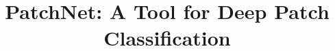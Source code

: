 \documentclass[conference]{IEEEtran}
\begin{document}
\title{PatchNet: A Tool  for Deep Patch Classification}
%

\maketitle









\balance

 
\end{document}
